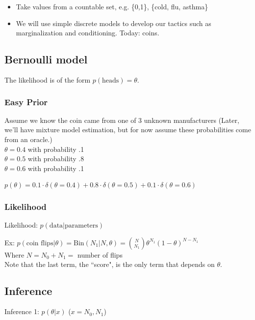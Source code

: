 \documentclass{article}
\begin{document}

\begin{itemize}
\item Take values from a countable set, e.g. \{0,1\}, \{cold, flu, asthma\}
\item We will use simple discrete models to develop our tactics such as marginalization and conditioning. Today: coins.
\end{itemize}

\subsection{Bernoulli model}
The likelihood is of the form $p(\text{heads}) = \theta$.

\subsubsection*{Easy Prior}
Assume we know the coin came from one of 3 unknown manufacturers (Later, we'll have mixture model estimation, but for now assume these probabilities come from an oracle.)\\
$\theta = 0.4$ with probability .1\\
$\theta = 0.5$ with probability .8\\
$\theta = 0.6$ with probability .1

$p(\theta) = 0.1 \cdot \delta(\theta = 0.4)  + 0.8 \cdot \delta(\theta = 0.5) + 0.1 \cdot \delta(\theta = 0.6)$


\subsubsection*{Likelihood}
Likelihood: $p(\text{data}|\text{parameters})$

Ex: $p(\text{coin flips}|\theta) = \textrm{Bin}(N_1 | N, \theta) = {N \choose N_1} \theta^{N_1} (1-\theta)^{N-N_1}$\\
Where $N = N_0 + N_1 =$ number of flips\\
Note that the last term, the ``score", is the only term that depends on $\theta$.

\subsection{Inference}
Inference 1: $p(\theta|x)$ ($x = N_0, N_1$)
\end{document}
